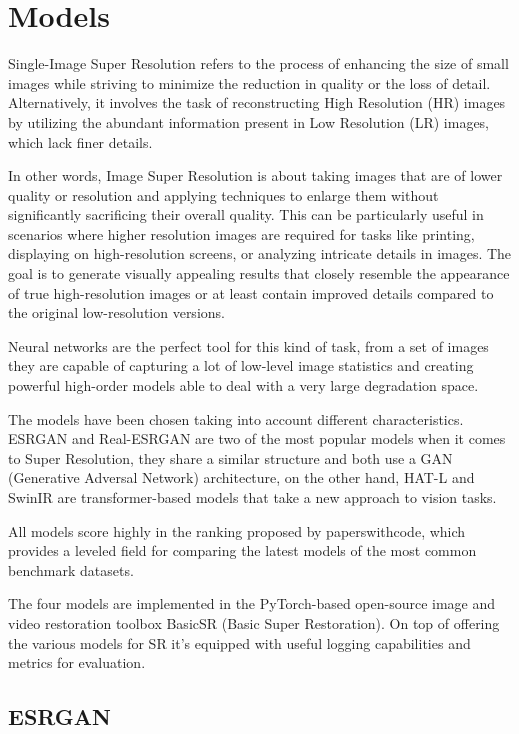 \newpage
\chapter{Models}
\label{cha:models}

Single-Image Super Resolution refers to the process of enhancing the size of small images while striving to minimize the reduction in quality or the loss of detail. Alternatively, it involves the task of reconstructing High Resolution (HR) images by utilizing the abundant information present in Low Resolution (LR) images, which lack finer details.

In other words, Image Super Resolution is about taking images that are of lower quality or resolution and applying techniques to enlarge them without significantly sacrificing their overall quality. This can be particularly useful in scenarios where higher resolution images are required for tasks like printing, displaying on high-resolution screens, or analyzing intricate details in images. The goal is to generate visually appealing results that closely resemble the appearance of true high-resolution images or at least contain improved details compared to the original low-resolution versions.

Neural networks are the perfect tool for this kind of task, from a set of images they are capable of capturing a lot of low-level image statistics and creating powerful high-order models able to deal with a very large degradation space.

The models have been chosen taking into account different characteristics. ESRGAN and Real-ESRGAN are two of the most popular models when it comes to Super Resolution, they share a similar structure and both use a GAN (Generative Adversal Network) architecture, on the other hand, HAT-L and SwinIR are transformer-based models that take a new approach to vision tasks.

All models score highly in the ranking proposed by paperswithcode\cite{pwcode}, which provides a leveled field for comparing the latest models of the most common benchmark datasets.

The four models are implemented in the PyTorch-based open-source image and video restoration toolbox BasicSR (Basic Super Restoration). On top of offering the various models for SR it's equipped with useful logging capabilities and metrics for evaluation.


\section{ESRGAN}
\label{subsec:esrgan}

